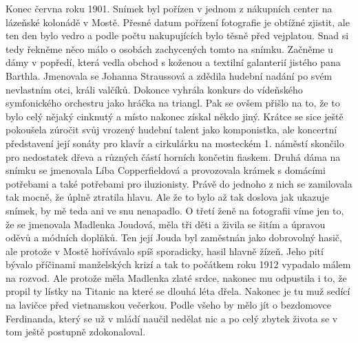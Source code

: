 
Konec června roku 1901. Snímek byl pořízen v jednom z nákupních center
na lázeňské kolonádě v Mostě. Přesné datum pořízení fotografie je
obtížné zjistit, ale ten den bylo vedro a podle počtu nakupujících
bylo těsně před vejplatou. Snad si tedy řekněme něco málo o osobách
zachycených tomto na snímku. Začněme u dámy v popředí, která vedla
obchod s koženou a textilní galanterií jistého pana Barthla. Jmenovala
se Johanna Straussová a zdědila hudební nadání po svém nevlastním
otci, králi valčíků. Dokonce vyhrála konkurs do vídeňského
symfonického orchestru jako hráčka na triangl. Pak se ovšem přišlo na
to, že to bylo celý nějaký cinknutý a místo nakonec získal někdo jiný.
Krátce se sice ještě pokoušela zúročit svůj vrozený hudební talent
jako komponistka, ale koncertní představení její sonáty pro klavír a
cirkulárku na mosteckém 1. náměstí skončilo pro nedostatek dřeva a
různých částí horních končetin fiaskem. Druhá dáma na snímku se
jmenovala Líba Copperfieldová a provozovala krámek s domácími
potřebami a také potřebami pro iluzionisty. Právě do jednoho z nich se
zamilovala tak mocně, že úplně ztratila hlavu. Ale že to bylo až tak
doslova jak ukazuje snímek, by mě teda ani ve snu nenapadlo. O třetí
ženě na fotografii víme jen to, že se jmenovala Madlenka Joudová, měla
tři děti a živila se šitím a úpravou oděvů a módních doplňků. Ten její
Jouda byl zaměstnán jako dobrovolný hasič, ale protože v Mostě
hořívávalo spíš sporadicky, hasil hlavně žízeň. Jeho pití bývalo
příčinami manželských krizí a tak to počátkem roku 1912 vypadalo málem
na rozvod. Ale protože měla Madlenka zlaté srdce, nakonec mu odpustila
i to, že propil ty lístky na Titanic na které se dlouhá léta dřela.
Nakonec je tu muž sedící na lavičce před vietnamskou večerkou. Podle
všeho by mělo jít o bezdomovce Ferdinanda, který se už v mládí naučil
nedělat nic a po celý zbytek života se v tom ještě postupně
zdokonaloval.

